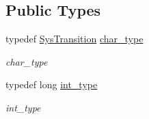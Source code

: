 \subsection*{Public Types}
\begin{DoxyCompactItemize}
\item 
typedef \hyperlink{class_sys_transition}{Sys\+Transition} \hyperlink{class_sys_transition_aa17f0f716cf9f7f3a860bf4606aea72a}{char\+\_\+type}\hypertarget{class_sys_transition_aa17f0f716cf9f7f3a860bf4606aea72a}{}\label{class_sys_transition_aa17f0f716cf9f7f3a860bf4606aea72a}

\begin{DoxyCompactList}\small\item\em char\+\_\+type \end{DoxyCompactList}\item 
typedef long \hyperlink{class_sys_transition_aa038700854a41ddc7c6d807250b515eb}{int\+\_\+type}\hypertarget{class_sys_transition_aa038700854a41ddc7c6d807250b515eb}{}\label{class_sys_transition_aa038700854a41ddc7c6d807250b515eb}

\begin{DoxyCompactList}\small\item\em int\+\_\+type \end{DoxyCompactList}\end{DoxyCompactItemize}
